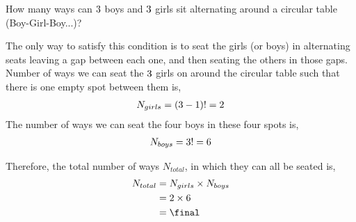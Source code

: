 
\gcalcexpr[0]\final{\vbthree * \vbtwo}

\question[4] How many ways can $3$ boys and $3$ girls sit alternating around a circular table (Boy-Girl-Boy...)?


\watchout

\ifprintanswers
\fi 

\begin{solution}[\halfpage]
  The only way to satisfy this condition is to seat the girls (or boys) in alternating seats leaving a gap between each one, and then seating the others in those gaps. Number of ways we can seat the $3$ girls on around the circular table such that there is one empty spot between them is,
  \begin{align}
    N_{girls} = (3-1)! = 2 
  \end{align}
  The number of ways we can seat the four boys in these four spots is,
  \begin{align}
    N_{boys} = 3! = 6
  \end{align}

  Therefore, the total number of ways $N_{total}$, in which they can all be seated is,
    \begin{align}
      N_{total} &= N_{girls} \times N_{boys} \\
                &= \vbtwo \times \vbthree \\
                &= \final 
    \end{align}

\end{solution}


